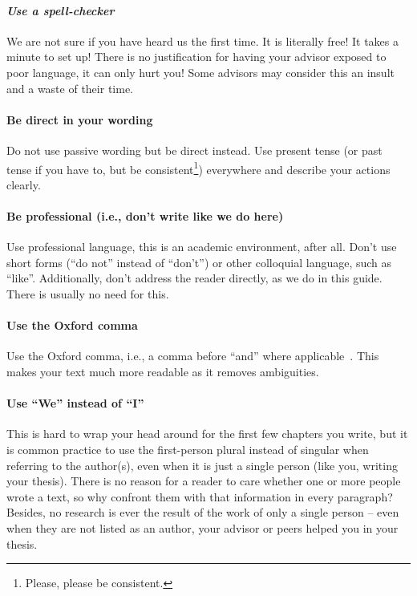 \documentclass[a4paper]{article}
\begin{document}
\paragraph{\textit{Use a spell-checker}}
We are not sure if you have heard us the first time.
It is literally free!
It takes a minute to set up!
There is no justification for having your advisor exposed to poor language, it can only hurt you!
Some advisors may consider this an insult and a waste of their time.

\paragraph{Be direct in your wording}
Do not use passive wording but be direct instead.
Use present tense (or past tense if you have to, but be consistent\footnote{Please, please be consistent.}) everywhere and describe your actions clearly.

\paragraph{Be professional (i.e., don't write like we do here)}
Use professional language, this is an academic environment, after all.
Don't use short forms (``do not'' instead of ``don't'') or other colloquial language, such as ``like''.
Additionally, don't address the reader directly, as we do in this guide.
There is usually no need for this.

\paragraph{Use the Oxford comma}
Use the Oxford comma, i.e., a comma before ``and'' where applicable~\cite{oxfordcomma}.
This makes your text much more readable as it removes ambiguities.

\paragraph{Use ``We'' instead of ``I''}
This is hard to wrap your head around for the first few chapters you write, but it is common practice to use the first-person plural instead of singular when referring to the author(s), even when it is just a single person (like you, writing your thesis).
There is no reason for a reader to care whether one or more people wrote a text, so why confront them with that information in every paragraph?
Besides, no research is ever the result of the work of only a single person -- even when they are not listed as an author, your advisor or peers helped you in your thesis.
\end{document}

